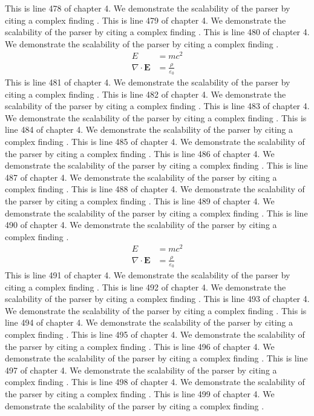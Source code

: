 This is line 478 of chapter 4. We demonstrate the scalability of the parser by citing a complex finding \cite{ref4_478}.
This is line 479 of chapter 4. We demonstrate the scalability of the parser by citing a complex finding \cite{ref4_479}.
This is line 480 of chapter 4. We demonstrate the scalability of the parser by citing a complex finding \cite{ref4_480}.
\begin{align*}
  E &= mc^2 \\
  \nabla \cdot \mathbf{E} &= \frac{\rho}{\varepsilon_0}
\end{align*}
This is line 481 of chapter 4. We demonstrate the scalability of the parser by citing a complex finding \cite{ref4_481}.
This is line 482 of chapter 4. We demonstrate the scalability of the parser by citing a complex finding \cite{ref4_482}.
This is line 483 of chapter 4. We demonstrate the scalability of the parser by citing a complex finding \cite{ref4_483}.
This is line 484 of chapter 4. We demonstrate the scalability of the parser by citing a complex finding \cite{ref4_484}.
This is line 485 of chapter 4. We demonstrate the scalability of the parser by citing a complex finding \cite{ref4_485}.
This is line 486 of chapter 4. We demonstrate the scalability of the parser by citing a complex finding \cite{ref4_486}.
This is line 487 of chapter 4. We demonstrate the scalability of the parser by citing a complex finding \cite{ref4_487}.
This is line 488 of chapter 4. We demonstrate the scalability of the parser by citing a complex finding \cite{ref4_488}.
This is line 489 of chapter 4. We demonstrate the scalability of the parser by citing a complex finding \cite{ref4_489}.
This is line 490 of chapter 4. We demonstrate the scalability of the parser by citing a complex finding \cite{ref4_490}.
\begin{align*}
  E &= mc^2 \\
  \nabla \cdot \mathbf{E} &= \frac{\rho}{\varepsilon_0}
\end{align*}
This is line 491 of chapter 4. We demonstrate the scalability of the parser by citing a complex finding \cite{ref4_491}.
This is line 492 of chapter 4. We demonstrate the scalability of the parser by citing a complex finding \cite{ref4_492}.
This is line 493 of chapter 4. We demonstrate the scalability of the parser by citing a complex finding \cite{ref4_493}.
This is line 494 of chapter 4. We demonstrate the scalability of the parser by citing a complex finding \cite{ref4_494}.
This is line 495 of chapter 4. We demonstrate the scalability of the parser by citing a complex finding \cite{ref4_495}.
This is line 496 of chapter 4. We demonstrate the scalability of the parser by citing a complex finding \cite{ref4_496}.
This is line 497 of chapter 4. We demonstrate the scalability of the parser by citing a complex finding \cite{ref4_497}.
This is line 498 of chapter 4. We demonstrate the scalability of the parser by citing a complex finding \cite{ref4_498}.
This is line 499 of chapter 4. We demonstrate the scalability of the parser by citing a complex finding \cite{ref4_499}.


